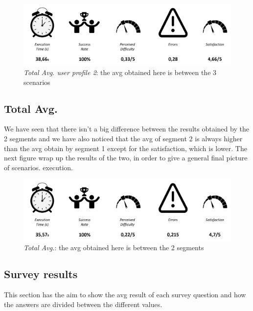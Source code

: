 \begin{figure}[h!]
	\centering
	\begin{minipage}[b]{1\textwidth}
    		\includegraphics[width=\textwidth]{./assets/avg-2.png}
		\caption{\emph{Total Avg. user profile 2}: the avg obtained here is between the 3 scenarios }
	\end{minipage}
\end{figure}
\FloatBarrier


\subsection{Total Avg.}
We have seen that there isn't a big difference between the results obtained by the 2 segments and we have also noticed that the avg of segment 2 is always higher than the avg obtain by segment 1 except for the satisfaction, which is lower. The next figure wrap up the results of the two,  in order to give a general final picture of scenarios. execution.
\begin{figure}[h!]
	\centering
	\begin{minipage}[b]{1\textwidth}
    		\includegraphics[width=\textwidth]{./assets/avg-tot.png}
		\caption{\emph{Total Avg.}: the avg obtained here is between the 2 segments}
	\end{minipage}
\end{figure}
\FloatBarrier

\subsection{Survey results}
This section has the aim to show the avg result of each survey question and how the answers are divided between the different values.

